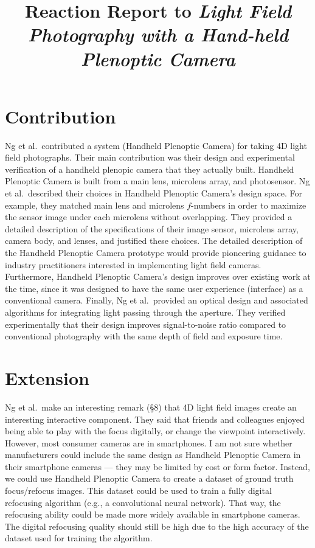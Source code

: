 \documentclass{article}
\title{Reaction Report to \em{Light Field Photography with a Hand-held Plenoptic Camera}}
\begin{document}
\maketitle

\section{Contribution}

Ng et al.\ contributed a system (Handheld Plenoptic Camera) for taking 4D light field photographs.
Their main contribution was their design and experimental verification of a
handheld plenopic camera that they actually built.
Handheld Plenoptic Camera is built from a main lens, microlens array, and photosensor.
Ng et al.\ described their choices in Handheld Plenoptic Camera's design space.
For example, they matched main lens and microlens $f$-numbers in order to
maximize the sensor image under each microlens without overlapping.
They provided a detailed description of the specifications of their image
sensor, microlens array, camera body, and lenses, and justified these choices.
The detailed description of the Handheld Plenoptic Camera prototype would
provide pioneering guidance to industry practitioners interested in implementing light field cameras.
Furthermore, Handheld Plenoptic Camera's design improves over existing work at
the time, since it was designed to have the same user experience (interface) as
a conventional camera.
Finally, Ng et al.\ provided an optical design and associated algorithms for integrating light passing through the aperture.
They verified experimentally that their design improves signal-to-noise ratio compared to conventional photography with the same depth of field and exposure time.


\section{Extension}

Ng et al.\ make an interesting remark (\S 8) that 4D light field images create an interesting interactive component.
They said that friends and colleagues enjoyed being able to play with the focus
digitally, or change the viewpoint interactively.
However, most consumer cameras are in smartphones.
I am not sure whether manufacturers could include the same design as Handheld Plenoptic Camera in their smartphone cameras ---
they may be limited by cost or form factor.
Instead, we could use Handheld Plenoptic Camera to create a dataset of ground truth focus/refocus images.
This dataset could be used to train a fully digital refocusing algorithm (e.g., a convolutional neural network).
That way, the refocusing ability could be made more widely available in
smartphone cameras. The digital refocusing quality should still be high due to the high accuracy of the dataset used for training the algorithm.
\end{document}

